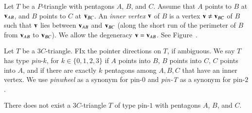 \begin{definition} Let $T$ be a $P$-triangle with pentagons $A$, $B$,
  and $C$.  Assume that $A$ points to $B$ at ${\mathbf v}_{AB}$, and $B$ points
  to $C$ at ${\mathbf v}_{BC}$.  An {\it inner vertex} ${\mathbf v}$ of $B$ is a vertex
  ${\mathbf v}\ne {\mathbf v}_{BC}$ of $B$ such that ${\mathbf v}$ lies between ${\mathbf v}_{AB}$ and
  ${\mathbf v}_{BC}$ (along the short run of the perimeter of $B$ from
  ${\mathbf v}_{AB}$ to ${\mathbf v}_{BC}$).  We allow the degeneracy ${\mathbf v}={\mathbf v}_{AB}$.
  See Figure~.
\end{definition}

\begin{definition} Let $T$ be a $3C$-triangle.  FIx the pointer
  directions on $T$, if ambiguous. We say $T$ has type {\it pin}-$k$,
  for $k\in \{0,1,2,3\}$ if $A$ points into $B$, $B$ points into $C$,
  $C$ points into $A$, and if there are exactly $k$ pentagons among
  $A,B,C$ that have an inner vertex.  We use {\it pinwheel} as a
  synonym for pin-$0$ and {\it pin-T} as a synonym for pin-$2$.
\end{definition}


\begin{lemma} There does not exist a  $3C$-triangle $T$ of type pin-$1$ with
  pentagons $A$, $B$, and $C$.  
\end{lemma}


